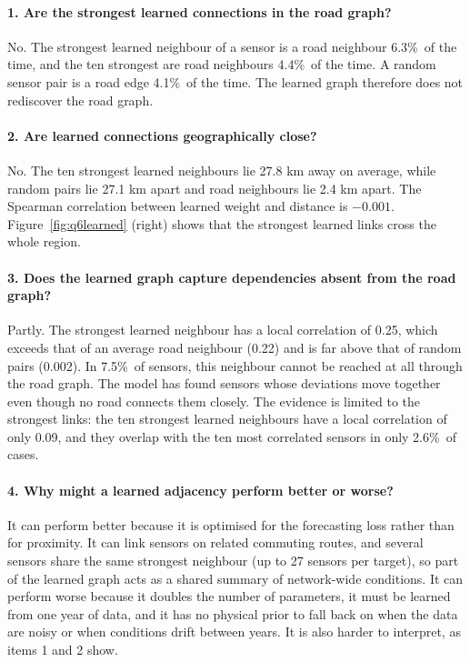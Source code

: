 \documentclass{article}
\newcommand{\pct}{\%\ }
\begin{document}
\paragraph{1. Are the strongest learned connections in the road graph?}
No. The strongest learned neighbour of a sensor is a road neighbour 6.3\pct of the time, and the ten strongest are road neighbours 4.4\pct of the time. A random sensor pair is a road edge 4.1\pct of the time. The learned graph therefore does not rediscover the road graph.

\paragraph{2. Are learned connections geographically close?}
No. The ten strongest learned neighbours lie 27.8 km away on average, while random pairs lie 27.1 km apart and road neighbours lie 2.4 km apart. The Spearman correlation between learned weight and distance is $-0.001$. Figure~\ref{fig:q6learned} (right) shows that the strongest learned links cross the whole region.

\paragraph{3. Does the learned graph capture dependencies absent from the road graph?}
Partly. The strongest learned neighbour has a local correlation of 0.25, which exceeds that of an average road neighbour (0.22) and is far above that of random pairs (0.002). In 7.5\pct of sensors, this neighbour cannot be reached at all through the road graph. The model has found sensors whose deviations move together even though no road connects them closely. The evidence is limited to the strongest links: the ten strongest learned neighbours have a local correlation of only 0.09, and they overlap with the ten most correlated sensors in only 2.6\pct of cases.

\paragraph{4. Why might a learned adjacency perform better or worse?}
It can perform better because it is optimised for the forecasting loss rather than for proximity. It can link sensors on related commuting routes, and several sensors share the same strongest neighbour (up to 27 sensors per target), so part of the learned graph acts as a shared summary of network-wide conditions. It can perform worse because it doubles the number of parameters, it must be learned from one year of data, and it has no physical prior to fall back on when the data are noisy or when conditions drift between years. It is also harder to interpret, as items 1 and 2 show.
\end{document}
